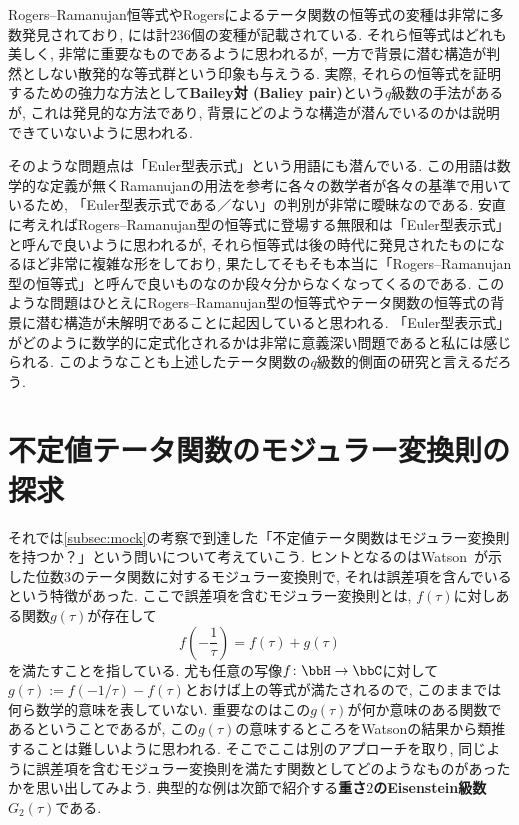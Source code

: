 \documentclass[11pt,b5paper,oneside,lualatex]{ltjsarticle} %
\numberwithin{equation}{section} %
\begin{document}
\begin{rem}
	Rogers--Ramanujan恒等式やRogersによるテータ関数の恒等式の変種は非常に多数発見されており, \cite[付録A]{魅惑}には計236個の変種が記載されている. 
	それら恒等式はどれも美しく, 非常に重要なものであるように思われるが, 一方で背景に潜む構造が判然としない散発的な等式群という印象も与えうる. 
	実際, それらの恒等式を証明するための強力な方法として\textbf{Bailey対 (Baliey pair)}という$ q $級数の手法があるが, これは発見的な方法であり, 背景にどのような構造が潜んでいるのかは説明できていないように思われる. 
	
	そのような問題点は「Euler型表示式」という用語にも潜んでいる. 
	この用語は数学的な定義が無くRamanujanの用法を参考に各々の数学者が各々の基準で用いているため, 「Euler型表示式である／ない」の判別が非常に曖昧なのである. 
	安直に考えればRogers--Ramanujan型の恒等式に登場する無限和は「Euler型表示式」と呼んで良いように思われるが, それら恒等式は後の時代に発見されたものになるほど非常に複雑な形をしており, 果たしてそもそも本当に「Rogers--Ramanujan型の恒等式」と呼んで良いものなのか段々分からなくなってくるのである. 
	このような問題はひとえにRogers--Ramanujan型の恒等式やテータ関数の恒等式の背景に潜む構造が未解明であることに起因していると思われる. 
	「Euler型表示式」がどのように数学的に定式化されるかは非常に意義深い問題であると私には感じられる. 
	このようなことも上述したテータ関数の$ q $級数的側面の研究と言えるだろう. 
\end{rem}


\section{不定値テータ関数のモジュラー変換則の探求} \label{sec:indefinite_theta}


それでは\cref{subsec:mock}の考察で到達した「不定値テータ関数はモジュラー変換則を持つか？」という問いについて考えていこう. 
ヒントとなるのはWatson~\cite[pp. 78]{Watson}が示した位数$ 3 $のテータ関数に対するモジュラー変換則で, それは誤差項を含んでいるという特徴があった.
ここで誤差項を含むモジュラー変換則とは, $ f(\tau) $に対しある関数$ g(\tau) $が存在して
\[
f \left( -\frac{1}{\tau} \right) = f(\tau) + g(\tau)
\]
を満たすことを指している. 
尤も任意の写像$ f \colon \bbH \to \bbC $に対して$ g(\tau) := f(-1/\tau) - f(\tau) $とおけば上の等式が満たされるので, このままでは何ら数学的意味を表していない. 
重要なのはこの$ g(\tau) $が何か意味のある関数であるということであるが, この$ g(\tau) $の意味するところをWatsonの結果から類推することは難しいように思われる. 
そこでここは別のアプローチを取り, 同じように誤差項を含むモジュラー変換則を満たす関数としてどのようなものがあったかを思い出してみよう. 
典型的な例は次節で紹介する\textbf{重さ$ 2 $のEisenstein級数}$ G_2(\tau) $である. 
\end{document}
